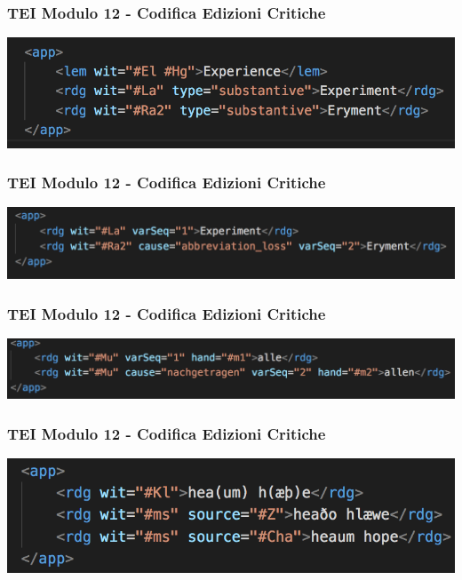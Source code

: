 \begin{frame}
    \frametitle{TEI Modulo 12 - Codifica Edizioni Critiche}
    \addtocounter{nframe}{1}
        
    \begin{center}
        \includegraphics[width=.95\textwidth]{imgs/2-lem-rdg.png}
    \end{center}

\end{frame}

\begin{frame}
    \frametitle{TEI Modulo 12 - Codifica Edizioni Critiche}
    \addtocounter{nframe}{1}
        
    \begin{center}
        \includegraphics[width=.95\textwidth]{imgs/3-app-cause-varSeq.png}
    \end{center}

\end{frame}

\begin{frame}
    \frametitle{TEI Modulo 12 - Codifica Edizioni Critiche}
    \addtocounter{nframe}{1}
        
    \begin{center}
        \includegraphics[width=.95\textwidth]{imgs/4-nachgetragen-aggiunta.png}
    \end{center}

\end{frame}

\begin{frame}
    \frametitle{TEI Modulo 12 - Codifica Edizioni Critiche}
    \addtocounter{nframe}{1}
        
    \begin{center}
        \includegraphics[width=.95\textwidth]{imgs/5-rdg-source.png}
    \end{center}

\end{frame}

